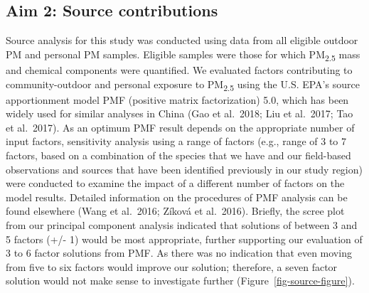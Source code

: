 \documentclass[
  letterpaper,
  DIV=11,
  numbers=noendperiod]{scrartcl}
\makeatletter
\renewenvironment{table}%
   {\renewcommand\familydefault\sfdefault
    \@float{table}}
   {\end@float}
\makeatother
\begin{document}
\begin{table}
{}

\end{table}%

\subsection{Aim 2: Source
contributions}\label{aim-2-source-contributions}

Source analysis for this study was conducted using data from all
eligible outdoor PM and personal PM samples. Eligible samples were those
for which PM\textsubscript{2.5} mass and chemical components were
quantified. We evaluated factors contributing to community-outdoor and
personal exposure to PM\textsubscript{2.5} using the U.S. EPA's source
apportionment model PMF (positive matrix factorization) 5.0, which has
been widely used for similar analyses in China (Gao et al.~2018; Liu et
al.~2017; Tao et al.~2017). As an optimum PMF result depends on the
appropriate number of input factors, sensitivity analysis using a range
of factors (e.g., range of 3 to 7 factors, based on a combination of the
species that we have and our field-based observations and sources that
have been identified previously in our study region) were conducted to
examine the impact of a different number of factors on the model
results. Detailed information on the procedures of PMF analysis can be
found elsewhere (Wang et al.~2016; Zíková et al.~2016). Briefly, the
scree plot from our principal component analysis indicated that
solutions of between 3 and 5 factors (+/- 1) would be most appropriate,
further supporting our evaluation of 3 to 6 factor solutions from PMF.
As there was no indication that even moving from five to six factors
would improve our solution; therefore, a seven factor solution would not
make sense to investigate further (Figure~\ref{fig-source-figure}).
\end{document}
